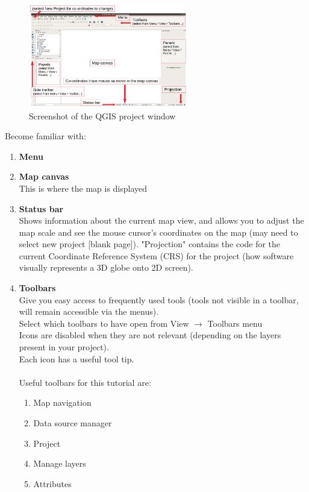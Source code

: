 \begin{figure}[!h]
	\centering
	\includegraphics[width=0.62\textwidth]{images/full_window}
	\caption{Screenshot of the QGIS project window}
	\label{ft_fig_firstfig3}
\end{figure}

Become familiar with:
\begin{enumerate}[~~~1)]
	\item
	\textbf{Menu}
	\item
	\textbf{Map canvas}\\
	This is where the map is displayed
	\item
	\textbf{Status bar}\\
	Shows information about the current map view, and allows you to adjust the map scale and see the mouse cursor’s coordinates on the map (may need to select new project [blank page]). "Projection" contains the code for the current Coordinate Reference System (CRS) for the project (how software visually represents a 3D globe onto 2D screen).%
	
	\item
	\textbf{Toolbars}\\
	Give you easy access to frequently used tools (tools not visible in a toolbar, will remain accessible via the menus).\\
	Select which toolbars to have open from View $\rightarrow$ Toolbars menu\\
	Icons are disabled when they are not relevant (depending on the layers present in your project).\\
	Each icon has a useful tool tip.\\
	\\
	Useful toolbars for this tutorial are:	
	\begin{enumerate}
		\item
		Map navigation
		\item
		Data source manager
		\item
		Project
		\item
		Manage layers
		\item
		Attributes
	\end{enumerate}



\end{enumerate}
